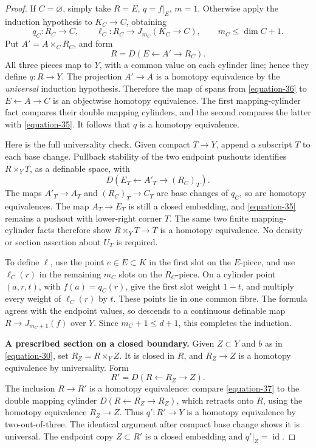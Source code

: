 \documentclass[11pt,a4paper]{article}
\theoremstyle{definition}
\begin{document}
\begin{proof}
If \(C=\varnothing\), simply take \(R=E\), \(q=f|_E\), \(m=1\). Otherwise apply the induction hypothesis to \(K_C\to C\), obtaining
\[
 q_C:R_C\to C,\qquad
 \ell_C:R_C\to J_{m_C}(K_C\to C),\qquad
 m_C\le\dim C+1.
\]
Put \(A'=A\times_CR_C\), and form
\begin{equation}
 R=D(E\leftarrow A'\to R_C).
 \label{equation-36}
\end{equation}
All three pieces map to \(Y\), with a common value on each cylinder line; hence they define \(q:R\to Y\). The projection \(A'\to A\) is a homotopy equivalence by the \emph{universal} induction hypothesis. Therefore the map of spans from \eqref{equation-36} to \(E\leftarrow A\to C\) is an objectwise homotopy equivalence. The first mapping-cylinder fact compares their double mapping cylinders, and the second compares the latter with \eqref{equation-35}. It follows that \(q\) is a homotopy equivalence.

Here is the full universality check. Given compact \(T\to Y\), append a subscript \(T\) to each base change. Pullback stability of the two endpoint pushouts identifies \(R\times_YT\), as a definable space, with
\[
 D(E_T\leftarrow A'_T\to (R_C)_T).
\]
The maps \(A'_T\to A_T\) and \((R_C)_T\to C_T\) are base changes of \(q_C\), so are homotopy equivalences. The map \(A_T\to E_T\) is still a closed embedding, and \eqref{equation-35} remains a pushout with lower-right corner \(T\). The same two finite mapping-cylinder facts therefore show \(R\times_YT\to T\) is a homotopy equivalence. No density or section assertion about \(U_T\) is required.

To define \(\ell\), use the point \(e\in E\subset K\) in the first slot on the \(E\)-piece, and use \(\ell_C(r)\) in the remaining \(m_C\) slots on the \(R_C\)-piece. On a cylinder point \((a,r,t)\), with \(f(a)=q_C(r)\), give the first slot weight \(1-t\), and multiply every weight of \(\ell_C(r)\) by \(t\). These points lie in one common fibre. The formula agrees with the endpoint values, so descends to a continuous definable map \(R\to J_{m_C+1}(f)\) over \(Y\). Since \(m_C+1\le d+1\), this completes the induction.

\textbf{A prescribed section on a closed boundary.}
Given \(Z\subset Y\) and \(b\) as in \eqref{equation-30}, set \(R_Z=R\times_YZ\). It is closed in \(R\), and \(R_Z\to Z\) is a homotopy equivalence by universality. Form
\begin{equation}
 R'=D(R\leftarrow R_Z\to Z).
 \label{equation-37}
\end{equation}
The inclusion \(R\to R'\) is a homotopy equivalence: compare \eqref{equation-37} to the double mapping cylinder \(D(R\leftarrow R_Z\to R_Z)\), which retracts onto \(R\), using the homotopy equivalence \(R_Z\to Z\). Thus \(q':R'\to Y\) is a homotopy equivalence by two-out-of-three. The identical argument after compact base change shows it is universal. The endpoint copy \(Z\subset R'\) is a closed embedding and \(q'|_Z=\operatorname{id}\).


\end{proof}
\end{document}
